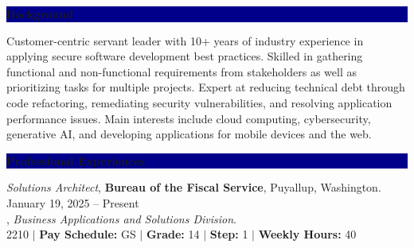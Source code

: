 \documentclass[10pt]{res} %
\begin{document}
\begin{resume}

\vspace{-14pt}

\colorbox{darkblue}{\color{white}\centerline{\bf Background}}

Customer-centric servant leader with 10+ years of industry experience in applying secure software development best practices.
Skilled in gathering functional and non-functional requirements from stakeholders as well as prioritizing tasks for multiple projects.
Expert at reducing technical debt through code refactoring, remediating security vulnerabilities, and resolving application performance issues.
Main interests include cloud computing, cybersecurity, generative AI, and developing applications for mobile devices and the web.


\vspace{0.025in}

\colorbox{darkblue}{\color{white}\centerline{\bf Professional Experiences}}

{\sl Solutions Architect}, {\bf Bureau of the Fiscal Service}, Puyallup, Washington. \hfill January 19, 2025 -- Present \\
\hspace*{1em}{\bf Information and Security Services (ISS)}, {\sl Business Applications and Solutions Division}. \\
\hspace*{1em}{\bf Series:} 2210 $|$ {\bf Pay Schedule:} GS $|$ {\bf Grade:} 14 $|$ {\bf Step:} 1 $|$ {\bf Weekly Hours:} 40


\end{resume}
\end{document}
